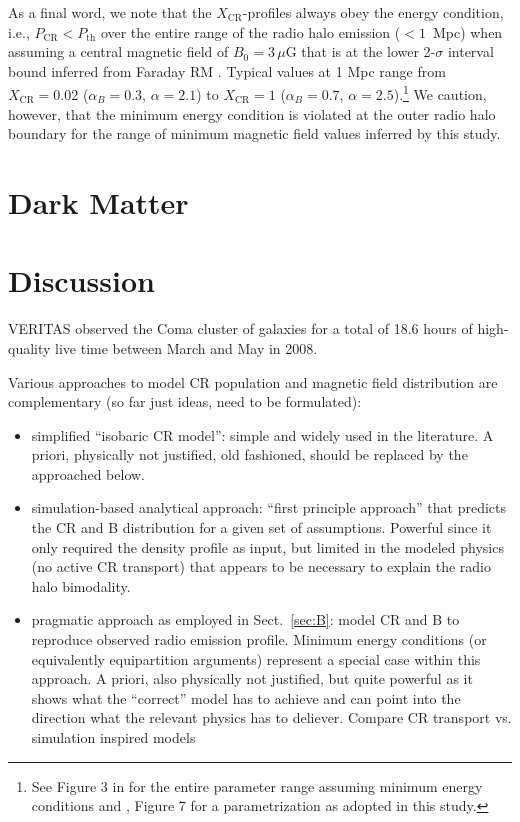 \documentclass[12pt,manuscript]{aastex}
\newcommand{\CR}{\mathrm{CR}}
\begin{document}
As a final word, we note that the $X_\CR$-profiles always obey the energy
condition, i.e., $P_\CR < P_\mathrm{th}$ over the entire range of the radio halo
emission ($< 1$~Mpc) when assuming a central magnetic field of $B_0=3\,\mu$G
that is at the lower 2-$\sigma$ interval bound inferred from Faraday RM
\citep{article:Bonafede_etal:2010}. Typical values at 1 Mpc range from $X_\CR = 0.02$
($\alpha_B=0.3$, $\alpha=2.1$) to $X_\CR = 1$ ($\alpha_B=0.7$,
$\alpha=2.5$).\footnote{See Figure 3 in \citet{article:PfrommerEnsslin:2004a} for the
  entire parameter range assuming minimum energy conditions and
  \citet{article:PfrommerEnsslin:2004b}, Figure 7 for a parametrization as adopted in this
  study.} We caution, however, that the minimum energy condition is violated at
the outer radio halo boundary for the range of minimum magnetic field values
inferred by this study.




\section{Dark Matter}

\section{Discussion}
VERITAS observed the Coma cluster of galaxies for a total of 18.6 hours of high-quality live time between March and May in 2008. 


Various approaches to model CR population and magnetic field distribution are
complementary (so far just ideas, need to be formulated):
\begin{itemize}
\item simplified ``isobaric CR model'': simple and widely used in the
  literature. A priori, physically not justified, old fashioned, should be
  replaced by the approached below.
\item simulation-based analytical approach: ``first principle approach'' that
  predicts the CR and B distribution for a given set of assumptions. Powerful
  since it only required the density profile as input, but limited in the
  modeled physics (no active CR transport) that appears to be necessary to
  explain the radio halo bimodality.
\item pragmatic approach as employed in Sect.~\ref{sec:B}: model CR and B to
  reproduce observed radio emission profile. Minimum energy conditions (or
  equivalently equipartition arguments) represent a special case within this
  approach. A priori, also physically not justified, but quite powerful as it
  shows what the ``correct'' model has to achieve and can point into the
  direction what the relevant physics has to deliever. Compare CR transport
  vs. simulation inspired models
\end{itemize}
\end{document}
